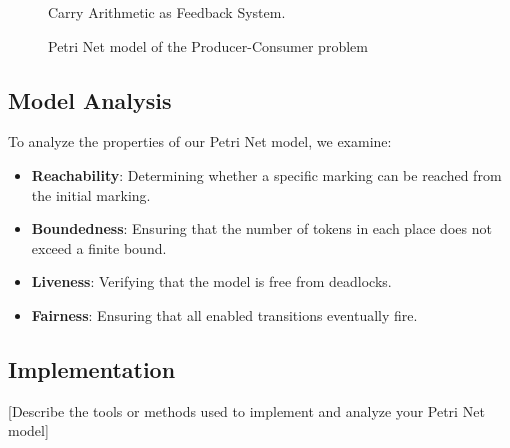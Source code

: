 \begin{figure}[htbp]
\centering

\caption{Carry Arithmetic as Feedback System.}
\label{fig:carry_arithmetic_feedback}
\end{figure}

\begin{figure}[htbp]
\centering

\caption{Petri Net model of the Producer-Consumer problem}
\label{fig:producer_consumer}
\end{figure}

\subsection{Model Analysis}

To analyze the properties of our Petri Net model, we examine:

\begin{itemize}
    \item \textbf{Reachability}: Determining whether a specific marking can be reached from the initial marking.
    \item \textbf{Boundedness}: Ensuring that the number of tokens in each place does not exceed a finite bound.
    \item \textbf{Liveness}: Verifying that the model is free from deadlocks.
    \item \textbf{Fairness}: Ensuring that all enabled transitions eventually fire.
\end{itemize}

\subsection{Implementation}

[Describe the tools or methods used to implement and analyze your Petri Net model]